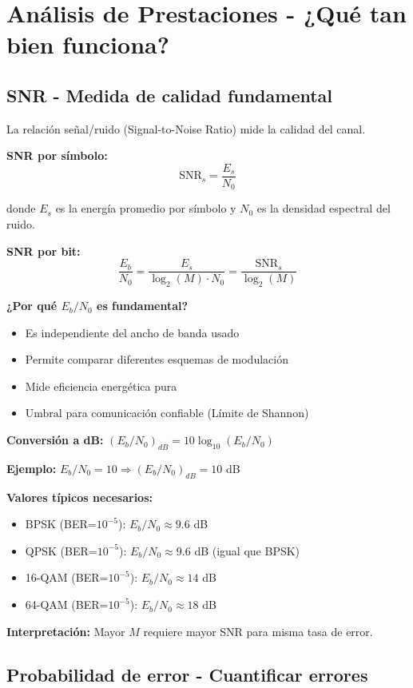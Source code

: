 \documentclass[10pt,a4paper]{article}
\begin{document}
\section{Análisis de Prestaciones - ¿Qué tan bien funciona?}

\subsection{SNR - Medida de calidad fundamental}

La relación señal/ruido (Signal-to-Noise Ratio) mide la calidad del canal.

\textbf{SNR por símbolo:} 
$$\text{SNR}_s = \frac{E_s}{N_0}$$

donde $E_s$ es la energía promedio por símbolo y $N_0$ es la densidad espectral del ruido.

\textbf{SNR por bit:} 
$$\frac{E_b}{N_0} = \frac{E_s}{\log_2(M) \cdot N_0} = \frac{\text{SNR}_s}{\log_2(M)}$$

\textbf{¿Por qué $E_b/N_0$ es fundamental?}
\begin{itemize}
\item Es independiente del ancho de banda usado
\item Permite comparar diferentes esquemas de modulación
\item Mide eficiencia energética pura
\item Umbral para comunicación confiable (Límite de Shannon)
\end{itemize}

\textbf{Conversión a dB:} $(E_b/N_0)_{dB} = 10\log_{10}(E_b/N_0)$

\textbf{Ejemplo:} $E_b/N_0 = 10 \Rightarrow (E_b/N_0)_{dB} = 10$ dB

\textbf{Valores típicos necesarios:}
\begin{itemize}
\item BPSK (BER=$10^{-5}$): $E_b/N_0 \approx 9.6$ dB
\item QPSK (BER=$10^{-5}$): $E_b/N_0 \approx 9.6$ dB (igual que BPSK)
\item 16-QAM (BER=$10^{-5}$): $E_b/N_0 \approx 14$ dB
\item 64-QAM (BER=$10^{-5}$): $E_b/N_0 \approx 18$ dB
\end{itemize}

\textbf{Interpretación:} Mayor $M$ requiere mayor SNR para misma tasa de error.

\subsection{Probabilidad de error - Cuantificar errores}
\end{document}
